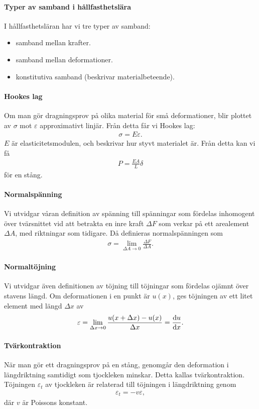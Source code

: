 \paragraph{Typer av samband i hållfasthetslära}
I hållfasthetsläran har vi tre typer av samband:
\begin{itemize}
	\item samband mellan krafter.
	\item samband mellan deformationer.
	\item konstitutiva samband (beskrivar materialbeteende).
\end{itemize}

\paragraph{Hookes lag}
Om man gör dragningsprov på olika material för små deformationer, blir plottet av $\sigma$ mot $\varepsilon$ approximativt linjär. Från detta får vi Hookes lag:
\begin{align*}
	\sigma = E\varepsilon.
\end{align*}
$E$ är elasticitetsmodulen, och beskrivar hur styvt materialet är. Från detta kan vi få
\begin{align*}
	P = \frac{EA}{L}\delta
\end{align*}
för en stång.

\paragraph{Normalspänning}
Vi utvidgar våran definition av spänning till spänningar som fördelas inhomogent över tvärsnittet vid att betrakta en inre kraft $\Delta F$ som verkar på ett arealement $\Delta A$, med riktningar som tidigare. Då definieras normalspänningen som
\begin{align*}
	\sigma = \lim\limits_{\Delta A\to 0}\frac{\Delta F}{\Delta A}.
\end{align*}

\paragraph{Normaltöjning}
Vi utvidgar även definitionen av töjning till töjningar som fördelas ojämnt över stavens längd. Om deformationen i en punkt är $u(x)$, ges töjningen av ett litet element med längd $\Delta x$ av
\begin{align*}
	\varepsilon = \lim\limits_{\Delta x\to 0}\frac{u(x + \Delta x) - u(x)}{\Delta x} = \dv{u}{x}.
\end{align*}

\paragraph{Tvärkontraktion}
När man gör ett dragningsprov på en stång, genomgår den deformation i längdriktning samtidigt som tjockleken minskar. Detta kallas tvärkontraktion. Töjningen $\varepsilon_{t}$ av tjockleken är relaterad till töjningen i längdriktning genom
\begin{align*}
	\varepsilon_{t} = -v\varepsilon,
\end{align*}
där $v$ är Poissons konstant.
